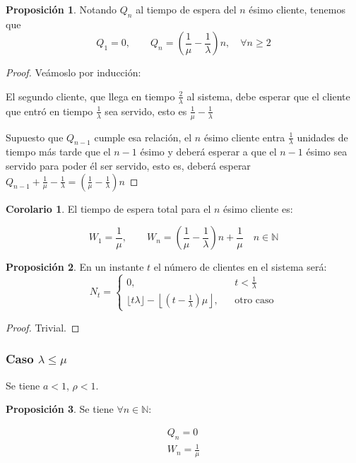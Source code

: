 \documentclass[a4paper,10pt]{scrartcl}
\theoremstyle{definition}
\newtheorem*{fact*}{Proposición}
\newtheorem*{corollary*}{Corolario}
\numberwithin{equation}{section}
\begin{document}
	\begin{fact*}
		Notando $Q_n$ al tiempo de espera del $n$ ésimo cliente, tenemos que \[Q_1 = 0, \qquad Q_n = \left(\frac{1}{\mu} - \frac{1}{\lambda}\right)n, \quad \forall n\ge 2\]
	\end{fact*}
	
	\begin{proof}
		Veámoslo por inducción:
		
		El segundo cliente, que llega en tiempo $\frac{2}{\lambda}$ al sistema, debe esperar que el cliente que entró en tiempo $\frac{1}{\lambda}$ sea servido,
		esto es $\frac{1}{\mu} - \frac{1}{\lambda}$
		
		Supuesto que $Q_{n-1}$ cumple esa relación, el $n$ ésimo cliente entra $\frac{1}{\lambda}$ unidades de tiempo
		más tarde que el $n-1$ ésimo y deberá esperar a que el $n-1$ ésimo sea servido para poder él ser servido, esto es,
		deberá esperar $Q_{n-1} + \frac{1}{\mu} - \frac{1}{\lambda} = \left(\frac{1}{\mu} - \frac{1}{\lambda}\right)n$
	\end{proof}
	
	\begin{corollary*}
		El tiempo de espera total para el $n$ ésimo cliente es:
		
		\[W_1 = \frac{1}{\mu}, \qquad W_n = \left(\frac{1}{\mu} - \frac{1}{\lambda}\right)n + \frac{1}{\mu} \quad n\in \mathbb{N}\]
	\end{corollary*}
	
	\begin{fact*}
		En un instante $t$ el número de clientes en el sistema será: 
		\[N_t = \left\{\begin{array}{lcc}
		0, && t < \frac{1}{\lambda}\\
		\lfloor t\lambda \rfloor - \left\lfloor\left(t-\frac{1}{\lambda}\right)\mu\right\rfloor, && \text{otro caso}
		\end{array}\right.\]
	\end{fact*}
	
	\begin{proof}
		Trivial.
	\end{proof}
	
	
	\subsubsection{Caso $\lambda \le \mu$}
	
	Se tiene $a < 1$, $\rho < 1$.
	
	\begin{fact*}
		Se tiene $\forall n\in \mathbb{N}$:
		
		\begin{align*}
		Q_n = 0\\
		W_n = \frac{1}{\mu}
		\end{align*}
	\end{fact*}
	
\end{document}
